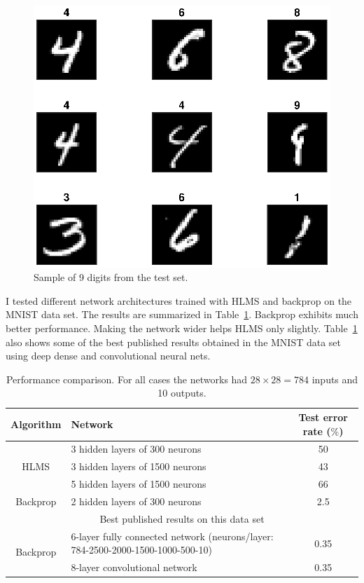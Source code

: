 \documentclass[a4paper, 10pt]{article}
\begin{document}
\begin{figure}[h!]
	\centering
	\includegraphics[width=\textwidth]{figs/mnist-samples.eps}
	\caption{Sample of 9 digits from the test set.} \label{fig:mnist}
\end{figure}

I tested different network architectures trained with HLMS and backprop on the MNIST data set. The results are summarized in Table~\ref{tab:mnist}. Backprop exhibits much better performance. Making the network wider helps HLMS only slightly. Table~\ref{tab:mnist} also shows some of the best published results obtained in the MNIST data set using deep dense and convolutional neural nets. 

\begin{table}[h!]
	\centering
	\caption{Performance comparison. For all cases the networks had $28 \times 28 = 784$ inputs and 10 outputs.} \label{tab:mnist}
	\begin{tabular}{c|p{7cm}|c}
		\hline
		Algorithm & Network & Test error rate ($\%$) \\
		\hline
		\multirow{3}{*}{HLMS} & 3 hidden layers of 300 neurons & 50 \\
		& 3 hidden layers of 1500 neurons & 43 \\
		& 5 hidden layers of 1500 neurons & 66 \\
		\hline
		Backprop & 2 hidden layers of 300 neurons & 2.5 \\
		\hline
		\multicolumn{3}{c}{Best published results on this data set} \\
		\hline
		\multirow{2}{*}{Backprop} & 6-layer fully connected network (neurons/layer: 784-2500-2000-1500-1000-500-10) & 0.35 \\
		 & 8-layer convolutional network & 0.35 \\
		\hline
	\end{tabular}
\end{table}
\end{document}
